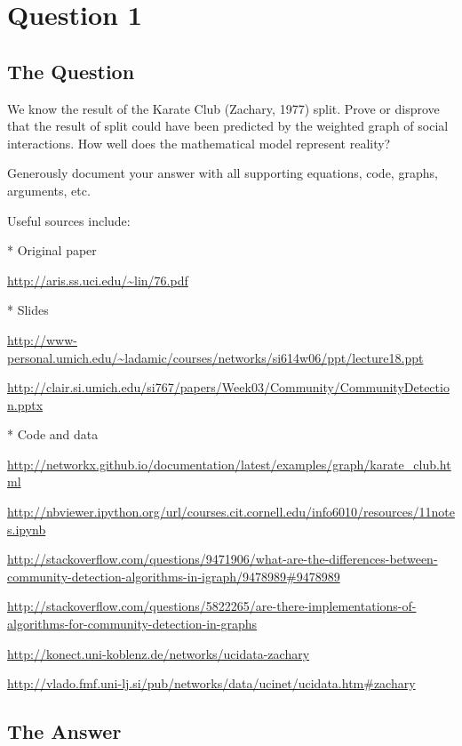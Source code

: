 \section{Question 1}

\subsection{The Question}

\begin{flushleft}

We know the result of the Karate Club (Zachary, 1977) split.
Prove or disprove that the result of split could have been predicted
by the weighted graph of social interactions.  How well does the
mathematical model represent reality?

Generously document your answer with all supporting equations, code,
graphs, arguments, etc.

Useful sources include:

* Original paper

\url{http://aris.ss.uci.edu/~lin/76.pdf}

* Slides

\url{http://www-personal.umich.edu/~ladamic/courses/networks/si614w06/ppt/lecture18.ppt}

\url{http://clair.si.umich.edu/si767/papers/Week03/Community/CommunityDetection.pptx}

* Code and data

\url{http://networkx.github.io/documentation/latest/examples/graph/karate_club.html}

\url{http://nbviewer.ipython.org/url/courses.cit.cornell.edu/info6010/resources/11notes.ipynb}

\url{http://stackoverflow.com/questions/9471906/what-are-the-differences-between-community-detection-algorithms-in-igraph/9478989#9478989}

\url{http://stackoverflow.com/questions/5822265/are-there-implementations-of-algorithms-for-community-detection-in-graphs}

\url{http://konect.uni-koblenz.de/networks/ucidata-zachary}

\url{http://vlado.fmf.uni-lj.si/pub/networks/data/ucinet/ucidata.htm#zachary}

\end{flushleft}
\subsection{The Answer}

